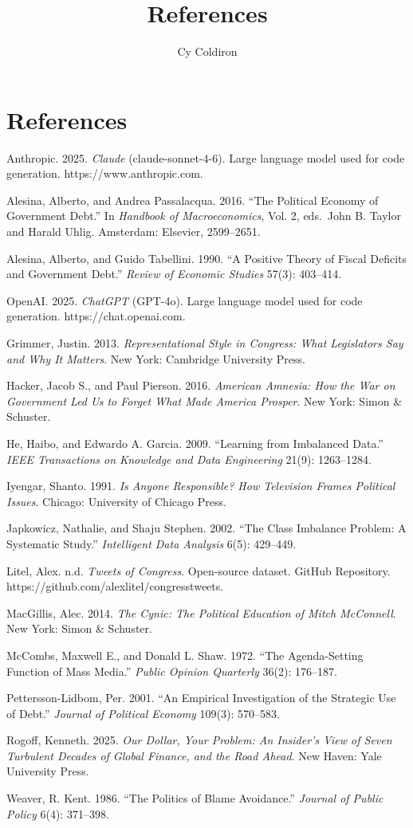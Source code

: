 \documentclass[
  11pt,
]{article}
\title{References}
\author{Cy Coldiron}
\date{}
\begin{document}
\maketitle


\section{References}\label{references}

\setlength{\parindent}{-1.5em}
\setlength{\leftskip}{1.5em}
\setlength{\parskip}{8pt}

Anthropic. 2025. \emph{Claude} (claude-sonnet-4-6). Large language model
used for code generation. https://www.anthropic.com.

Alesina, Alberto, and Andrea Passalacqua. 2016. ``The Political Economy
of Government Debt.'' In \emph{Handbook of Macroeconomics}, Vol. 2,
eds.~John B. Taylor and Harald Uhlig. Amsterdam: Elsevier, 2599--2651.

Alesina, Alberto, and Guido Tabellini. 1990. ``A Positive Theory of
Fiscal Deficits and Government Debt.'' \emph{Review of Economic Studies}
57(3): 403--414.

OpenAI. 2025. \emph{ChatGPT} (GPT-4o). Large language model used for
code generation. https://chat.openai.com.

Grimmer, Justin. 2013. \emph{Representational Style in Congress: What
Legislators Say and Why It Matters}. New York: Cambridge University
Press.

Hacker, Jacob S., and Paul Pierson. 2016. \emph{American Amnesia: How
the War on Government Led Us to Forget What Made America Prosper}. New
York: Simon \& Schuster.

He, Haibo, and Edwardo A. Garcia. 2009. ``Learning from Imbalanced
Data.'' \emph{IEEE Transactions on Knowledge and Data Engineering}
21(9): 1263--1284.

Iyengar, Shanto. 1991. \emph{Is Anyone Responsible? How Television
Frames Political Issues}. Chicago: University of Chicago Press.

Japkowicz, Nathalie, and Shaju Stephen. 2002. ``The Class Imbalance
Problem: A Systematic Study.'' \emph{Intelligent Data Analysis} 6(5):
429--449.

Litel, Alex. n.d. \emph{Tweets of Congress}. Open-source dataset. GitHub
Repository. https://github.com/alexlitel/congresstweets.

MacGillis, Alec. 2014. \emph{The Cynic: The Political Education of Mitch
McConnell}. New York: Simon \& Schuster.

McCombs, Maxwell E., and Donald L. Shaw. 1972. ``The Agenda-Setting
Function of Mass Media.'' \emph{Public Opinion Quarterly} 36(2):
176--187.

Pettersson-Lidbom, Per. 2001. ``An Empirical Investigation of the
Strategic Use of Debt.'' \emph{Journal of Political Economy} 109(3):
570--583.

Rogoff, Kenneth. 2025. \emph{Our Dollar, Your Problem: An Insider's View
of Seven Turbulent Decades of Global Finance, and the Road Ahead}. New
Haven: Yale University Press.

Weaver, R. Kent. 1986. ``The Politics of Blame Avoidance.''
\emph{Journal of Public Policy} 6(4): 371--398.
\end{document}
